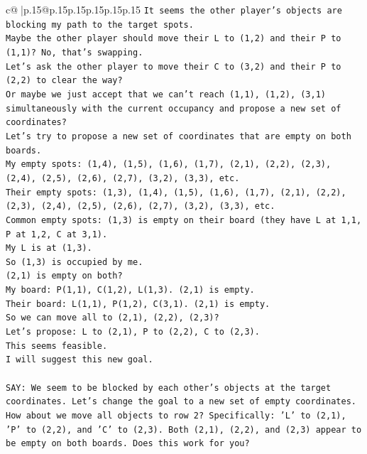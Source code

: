 \documentclass{article}
\begin{document}
{\begin{supertabular}{c@{$\;$}|p{.15\linewidth}@{}p{.15\linewidth}p{.15\linewidth}p{.15\linewidth}p{.15\linewidth}p{.15\linewidth}}
{{{\texttt{It seems the other player's objects are blocking my path to the target spots.} \\
\texttt{Maybe the other player should move their L to (1,2) and their P to (1,1)? No, that's swapping.} \\
\texttt{Let's ask the other player to move their C to (3,2) and their P to (2,2) to clear the way?} \\
\texttt{Or maybe we just accept that we can't reach (1,1), (1,2), (3,1) simultaneously with the current occupancy and propose a new set of coordinates?} \\
\texttt{Let's try to propose a new set of coordinates that are empty on both boards.} \\
\texttt{My empty spots: (1,4), (1,5), (1,6), (1,7), (2,1), (2,2), (2,3), (2,4), (2,5), (2,6), (2,7), (3,2), (3,3), etc.} \\
\texttt{Their empty spots: (1,3), (1,4), (1,5), (1,6), (1,7), (2,1), (2,2), (2,3), (2,4), (2,5), (2,6), (2,7), (3,2), (3,3), etc.} \\
\texttt{Common empty spots: (1,3) is empty on their board (they have L at 1,1, P at 1,2, C at 3,1).} \\
\texttt{My L is at (1,3).} \\
\texttt{So (1,3) is occupied by me.} \\
\texttt{(2,1) is empty on both?} \\
\texttt{My board: P(1,1), C(1,2), L(1,3). (2,1) is empty.} \\
\texttt{Their board: L(1,1), P(1,2), C(3,1). (2,1) is empty.} \\
\texttt{So we can move all to (2,1), (2,2), (2,3)?} \\
\texttt{Let's propose: L to (2,1), P to (2,2), C to (2,3).} \\
\texttt{This seems feasible.} \\
\texttt{I will suggest this new goal.} \\
\\ 
\texttt{SAY: We seem to be blocked by each other's objects at the target coordinates. Let's change the goal to a new set of empty coordinates. How about we move all objects to row 2? Specifically: 'L' to (2,1), 'P' to (2,2), and 'C' to (2,3). Both (2,1), (2,2), and (2,3) appear to be empty on both boards. Does this work for you?} \\
            }
        }
    }
     \\ \\


\end{supertabular}}
\end{document}
